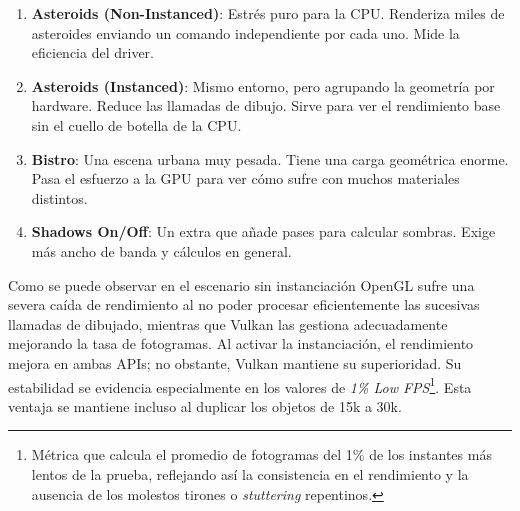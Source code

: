\begin{enumerate}
    \item \textbf{Asteroids (Non-Instanced)}: Estrés puro para la CPU. Renderiza miles de asteroides enviando un comando independiente por cada uno. Mide la eficiencia del driver.
    \item \textbf{Asteroids (Instanced)}: Mismo entorno, pero agrupando la geometría por hardware. Reduce las llamadas de dibujo. Sirve para ver el rendimiento base sin el cuello de botella de la CPU.
    \item \textbf{Bistro}: Una escena urbana muy pesada. Tiene una carga geométrica enorme. Pasa el esfuerzo a la GPU para ver cómo sufre con muchos materiales distintos.
    \item \textbf{Shadows On/Off}: Un extra que añade pases para calcular sombras. Exige más ancho de banda y cálculos en general.
\end{enumerate}

\begin{table}[ht]
    \centering
    \renewcommand{\arraystretch}{1.2}
    \caption{Rendimiento de Vulkan vs. OpenGL (NVIDIA RTX 2060 Max-Q).} 
    \label{tab:comparativa_vulkan_opengl} 
\end{table}



Como se puede observar en el escenario sin instanciación OpenGL sufre una severa caída de rendimiento al no poder procesar eficientemente las sucesivas llamadas de dibujado, mientras que Vulkan las gestiona adecuadamente mejorando la tasa de fotogramas.
Al activar la instanciación, el rendimiento mejora en ambas APIs; no obstante, Vulkan mantiene su superioridad. Su estabilidad se evidencia especialmente en los valores de \textit{1\% Low FPS}\footnote{Métrica que calcula el promedio de fotogramas del 1\% de los instantes más lentos de la prueba, reflejando así la consistencia en el rendimiento y la ausencia de los molestos tirones o \textit{stuttering} repentinos.}.                                   
Esta ventaja se mantiene incluso al duplicar los objetos de 15k a 30k.


